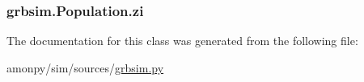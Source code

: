 \hypertarget{classgrbsim_1_1_population_a7780a80e30452b2a4682f7b6f2bf0d18}{
\subsubsection[{zi}]{\setlength{\rightskip}{0pt plus 5cm}grbsim.\-Population.\-zi}}\label{classgrbsim_1_1_population_a7780a80e30452b2a4682f7b6f2bf0d18}


The documentation for this class was generated from the following file\-:\begin{DoxyCompactItemize}
\item 
amonpy/sim/sources/\hyperlink{grbsim_8py}{grbsim.\-py}\end{DoxyCompactItemize}
